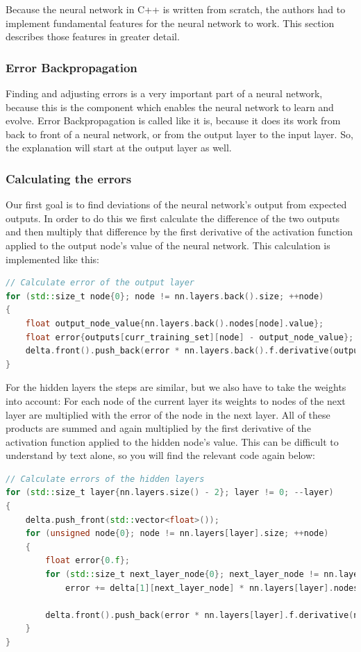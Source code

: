 Because the neural network in C++ is written from scratch, the authors had to implement fundamental features for the neural network to work. This section describes those features in greater detail.

\subsubsection{Error Backpropagation}
Finding and adjusting errors is a very important part of a neural network, because this is the component which enables the neural network to learn and evolve. Error Backpropagation is called like it is, because it does its work from back to front of a neural network, or from the output layer to the input layer. So, the explanation will start at the output layer as well.

\subsubsection{Calculating the errors}

Our first goal is to find deviations of the neural network's output from expected outputs. In order to do this we first calculate the difference of the two outputs and then multiply that difference by the first derivative of the activation function applied to the output node's value of the neural network. This calculation is implemented like this:

\begin{lstlisting}[language=C++]
// Calculate error of the output layer
for (std::size_t node{0}; node != nn.layers.back().size; ++node)
{
	float output_node_value{nn.layers.back().nodes[node].value};
	float error{outputs[curr_training_set][node] - output_node_value};
	delta.front().push_back(error * nn.layers.back().f.derivative(output_node_value));
}
\end{lstlisting}

For the hidden layers the steps are similar, but we also have to take the weights into account: For each node of the current layer its weights to nodes of the next layer are multiplied with the error of the node in the next layer. All of these products are summed and again multiplied by the first derivative of the activation function applied to the hidden node's value. This can be difficult to understand by text alone, so you will find the relevant code again below:

\begin{lstlisting}[language=C++]
// Calculate errors of the hidden layers
for (std::size_t layer{nn.layers.size() - 2}; layer != 0; --layer)
{
	delta.push_front(std::vector<float>());
	for (unsigned node{0}; node != nn.layers[layer].size; ++node)
	{
		float error{0.f};
		for (std::size_t next_layer_node{0}; next_layer_node != nn.layers[layer + 1].dim; ++next_layer_node)
			error += delta[1][next_layer_node] * nn.layers[layer].nodes[node].weights[next_layer_node];

		delta.front().push_back(error * nn.layers[layer].f.derivative(nn.layers[layer].nodes[node].value));
	}
}
\end{lstlisting}

